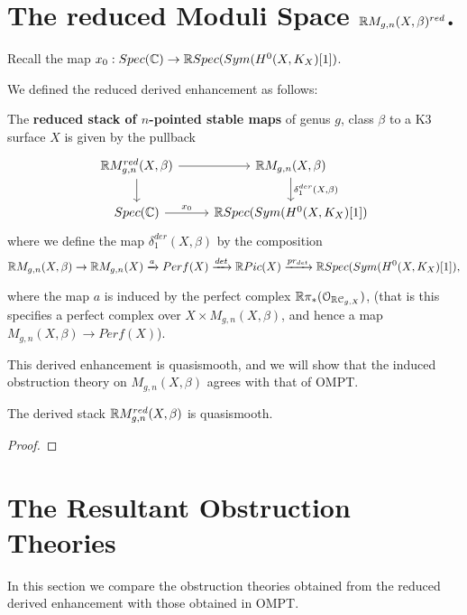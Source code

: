 \section{The reduced Moduli Space $\mathbb R M_{g,n}(X,\beta)^{red}$.}
\label{sec:reduced moduli space}

Recall the map $x_{0}:Spec(\mathbb C)\rightarrow  \mathbb R Spec(Sym(H^{0}(X,K_{X})[1])$.

We defined the reduced derived enhancement as follows:
\begin{defin}
The \textbf{reduced stack of $n$-pointed stable maps} of genus $g$, class $\beta$ to a K3 surface $X$ is given by the pullback
\[
\begin{tikzcd}
\R M_{g,n}^{red}(X,\beta)\arrow{r}\arrow{d} & \R M_{g,n}(X,\beta)\arrow{d}{\delta_{1}^{der}(X,\beta)} \\
Spec(\C)\arrow{r}{x_{0}} & \R Spec(Sym(H^{0}(X,K_{X})[1])
\end{tikzcd}
\]
where we define the map $\delta_{1}^{der}(X,\beta)$ by the composition
\[\mathbb R M_{g,n}(X,\beta)\rightarrow \mathbb R M_{g,n}(X)\xrightarrow{a} Perf(X)\xrightarrow{det} \mathbb R Pic(X)\xrightarrow{pr_{det}} \mathbb R Spec(Sym(H^{0}(X,K_{X})[1]),\]

where the map $a$ is induced by the perfect complex $\mathbb R \pi_{*}(\mathcal{O}_{\mathbb R \mathcal{C}_{g,X}})$, (that is this specifies a perfect complex over $X\times M_{g,n}(X,\beta)$, and hence a map  $M_{g,n}(X,\beta)\rightarrow Perf(X)$).
\end{defin}

\begin{rem}
This derived enhancement is quasismooth, and we will show that the induced obstruction theory on $M_{g,n}(X,\beta)$ agrees with that of OMPT.
\end{rem}

\begin{prop}
The derived stack $\mathbb R M_{g,n}^{red}(X,\beta)$ is quasismooth.
\end{prop}

\begin{proof}
\end{proof}

\section{The Resultant Obstruction Theories}

In this section we compare the obstruction theories obtained from the reduced derived enhancement with those obtained in OMPT.

